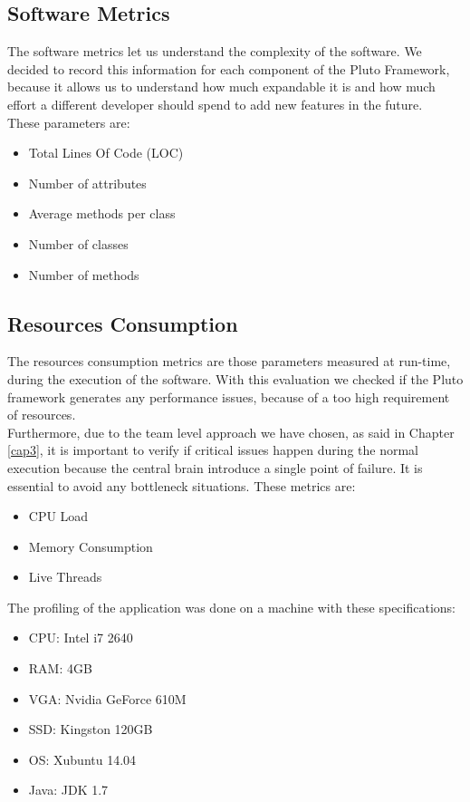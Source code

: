 \subsection{Software Metrics}

The software metrics let us understand the complexity of the software.
We decided to record this information for each component of the Pluto Framework, because it allows us to understand how much expandable it is and how much effort a different developer should spend to add new features in the future.
\\

These parameters are:

\begin{itemize}
\item Total Lines Of Code (LOC)
\item Number of attributes
\item Average methods per class
\item Number of classes
\item Number of methods
\end{itemize}

\subsection{Resources Consumption}

The resources consumption metrics are those parameters measured at run-time, during the execution of the software.
With this evaluation we checked if the Pluto framework generates any performance issues, because of a too high requirement of resources. 
\\
Furthermore, due to the team level approach we have chosen, as said in Chapter \ref{cap3}, it is important to verify if critical issues happen during the normal execution because the central brain introduce a single point of failure. It is essential to avoid any bottleneck situations.
These metrics are:

\begin{itemize}
\item CPU Load
\item Memory Consumption
\item Live Threads
\end{itemize}

The profiling of the application was done on a machine with these specifications:

\begin{itemize}
\item CPU: Intel i7 2640
\item RAM: 4GB
\item VGA: Nvidia GeForce 610M
\item SSD: Kingston 120GB
\item OS: Xubuntu 14.04
\item Java: JDK 1.7
\end{itemize}

